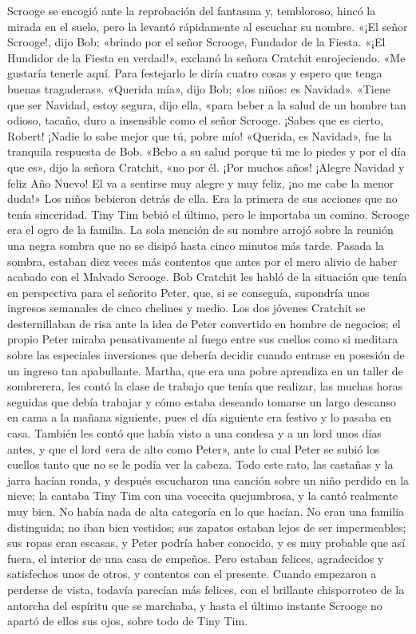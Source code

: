 \documentclass{novela}
\begin{document}
 Scrooge se encogió ante la reprobación del fantasma y, tembloroso, hincó la mirada en el suelo, pero la levantó rápidamente al escuchar su nombre.
 «¡El señor Scrooge!, dijo Bob; «brindo por el señor Scrooge, Fundador de la Fiesta.
 «¡El Hundidor de la Fiesta en verdad!», exclamó la señora Cratchit enrojeciendo. «Me gustaría tenerle aquí. Para festejarlo le diría cuatro cosas y espero que tenga buenas tragaderas».
 «Querida mía», dijo Bob; «los niños: es Navidad».
 «Tiene que ser Navidad, estoy segura, dijo ella, «para beber a la salud de un hombre tan odioso, tacaño, duro a insensible como el señor Scrooge. ¡Sabes que es cierto, Robert! ¡Nadie lo sabe mejor que tú, pobre mío!
 «Querida, es Navidad», fue la tranquila respuesta de Bob.
 «Bebo a su salud porque tú me lo piedes y por el día que es», dijo la señora Cratchit, «no por él. ¡Por muchos años! ¡Alegre Navidad y feliz Año Nuevo! El va a sentirse muy alegre y muy feliz, ¡no me cabe la menor duda!»
 Los niños bebieron detrás de ella. Era la primera de sus acciones que no tenía sinceridad. Tiny Tim bebió el último, pero le importaba un comino. Scrooge era el ogro de la familia. La sola mención de su nombre arrojó sobre la reunión una negra sombra que no se disipó hasta cinco minutos más tarde. Pasada la sombra, estaban diez veces más contentos que antes por el mero alivio de haber acabado con el Malvado Scrooge. Bob Cratchit les habló de la situación que tenía en perspectiva para el señorito Peter, que, si se conseguía, supondría unos ingresos semanales de cinco chelines y medio. Los dos jóvenes Cratchit se desternillaban de risa ante la idea de Peter convertido en hombre de negocios; el propio Peter miraba pensativamente al fuego entre sus cuellos como si meditara sobre las especiales inversiones que debería decidir cuando entrase en posesión de un ingreso tan apabullante. Martha, que era una pobre aprendiza en un taller de sombrerera, les contó la clase de trabajo que tenía que realizar, las muchas horas seguidas que debía trabajar y cómo estaba deseando tomarse un largo descanso en cama a la mañana siguiente, pues el día siguiente era festivo y lo pasaba en casa. También les contó que había visto a una condesa y a un lord unos días antes, y que el lord «era de alto como Peter», ante lo cual Peter se subió los cuellos tanto que no se le podía ver la cabeza. Todo este rato, las castañas y la jarra hacían ronda, y después escucharon una canción sobre un niño perdido en la nieve; la cantaba Tiny Tim con una vocecita quejumbrosa, y la cantó realmente muy bien.
 No había nada de alta categoría en lo que hacían. No eran una familia distinguida; no iban bien vestidos; sus zapatos estaban lejos de ser impermeables; sus ropas eran escasas, y Peter podría haber conocido, y es muy probable que así fuera, el interior de una casa de empeños. Pero estaban felices, agradecidos y satisfechos unos de otros, y contentos con el presente. Cuando empezaron a perderse de vista, todavía parecían más felices, con el brillante chisporroteo de la antorcha del espíritu que se marchaba, y hasta el último instante Scrooge no apartó de ellos sus ojos, sobre todo de Tiny Tim.
\end{document}
